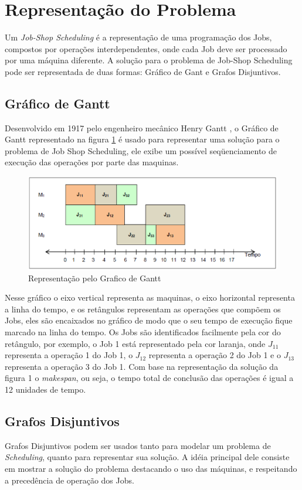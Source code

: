 \section{Representação do Problema}\label{sec:rep_prob}
Um \textit{Job-Shop Scheduling} é a representação de uma programação dos Jobs, compostos por operações interdependentes, onde cada Job deve ser processado por uma máquina diferente. A solução para o problema de Job-Shop Scheduling pode ser representada de duas formas: Gráfico de Gant e Grafos Disjuntivos.

\subsection{Gráfico de Gantt}
Desenvolvido em 1917 pelo engenheiro mecânico Henry Gantt \cite{WIKIGANT}, o Gráfico de Gantt representado na figura \ref{graf_gantt} é usado para representar uma solução para o problema de Job Shop Scheduling, ele exibe um possível seqüenciamento de execução das operações por parte das maquinas.

\begin{figure}[H]
\centering
\includegraphics[scale = 0.6]{graficos/graf_gantt.eps}
\caption{Representação pelo Grafico de Gantt}
\label{graf_gantt}
\end{figure}

Nesse gráfico o eixo vertical representa as maquinas, o eixo horizontal representa a linha do tempo, e os retângulos representam as operações que compõem os Jobs, eles são encaixados no gráfico de modo que o seu tempo de execução fique marcado na linha do tempo. Os Jobs são identificados facilmente pela cor do retângulo, por exemplo, o Job 1 está representado pela cor laranja, onde $J_{11}$ representa a operação 1 do Job 1, o $J_{12}$ representa a operação 2 do Job 1 e o $J_{13}$ representa a operação 3 do Job 1. Com base na representação da solução da figura 1 o \textit{makespan}, ou seja, o tempo total de conclusão das operações é igual a 12 unidades de tempo.

\subsection{Grafos Disjuntivos}
Grafos Disjuntivos podem ser usados tanto para modelar um problema de \textit{Scheduling}, quanto para representar sua solução. A idéia principal dele consiste em mostrar a solução do problema destacando o uso das máquinas, e respeitando a precedência de operação dos Jobs. 

